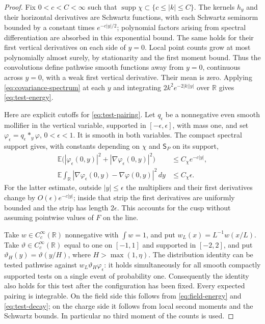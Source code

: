 \documentclass[11pt,reqno]{amsart}
\numberwithin{equation}{section}
\theoremstyle{definition}
\theoremstyle{remark}
\newcommand{\R}{\mathbb R}
\newcommand{\E}{\mathbb E}
\newcommand{\1}{\mathbf 1}
\newcommand{\Spec}{\mathsf S_P}
\newcommand{\dd}{\,d}
\begin{document}
\begin{proof}
Fix $0<c<C<\infty$ such that $\operatorname{supp}\chi\subset
\{c\le|k|\le C\}$. The kernels $h_y$ and their horizontal
derivatives are Schwartz functions, with each Schwartz seminorm bounded
by a constant times $e^{-c|y|/2}$; polynomial factors arising from
spectral differentiation are absorbed in this exponential bound.
The same holds for their first vertical derivatives on each side of
$y=0$. Local point counts grow at most polynomially almost surely,
by stationarity and the first moment bound. Thus the convolutions
define pathwise smooth functions away from $y=0$, continuous across
$y=0$, with a weak first vertical derivative. Their mean is zero.
Applying \eqref{eq:covariance-spectrum} at each $y$ and integrating
$2k^2e^{-2|k||y|}$ over $\R$ gives
\eqref{eq:test-energy}.

Here are explicit cutoffs for \eqref{eq:test-pairing}. Let
$q_\epsilon$ be a nonnegative even smooth mollifier in the vertical
variable, supported in $[-\epsilon,\epsilon]$, with mass one, and set
$\varphi_\epsilon=q_\epsilon*_y\varphi$, $0<\epsilon<1$.
It is smooth in both variables. The compact spectral support gives,
with constants depending on $\chi$ and $\Spec$ on its support,
\begin{align}
\E\bigl(|\varphi_\epsilon(0,y)|^2+
|\nabla\varphi_\epsilon(0,y)|^2\bigr)
&\le C_\chi e^{-c|y|},\label{eq:test-decay}\\
\E\int_\R|\nabla\varphi_\epsilon(0,y)-
\nabla\varphi(0,y)|^2\dd y
&\le C_\chi\epsilon.\label{eq:test-smoothing}
\end{align}
For the latter estimate, outside $|y|\le\epsilon$ the multipliers and
their first derivatives change by $O(\epsilon)e^{-c|y|}$; inside that
strip the first derivatives are uniformly bounded and the strip has
length $2\epsilon$. This accounts for the cusp without assuming
pointwise values of $F$ on the line.

Take $w\in C_c^\infty(\R)$ nonnegative with $\int w=1$, and put
$w_L(x)=L^{-1}w(x/L)$. Take $\vartheta\in C_c^\infty(\R)$ equal to one
on $[-1,1]$ and supported in $[-2,2]$, and put
$\vartheta_H(y)=\vartheta(y/H)$, where $H>\max(1,\eta)$.
The distribution identity can be tested pathwise against
$w_L\vartheta_H\varphi_\epsilon$: it holds simultaneously for all smooth
compactly supported tests on a single event of probability one.
Consequently the identity also holds for this test after the configuration
has been fixed.
Every expected pairing is integrable. On the field side this follows
from \eqref{eq:field-energy} and \eqref{eq:test-decay}; on the charge
side it follows from local second moments and the Schwartz bounds.
In particular no third moment of the counts is used.


\end{proof}
\end{document}
